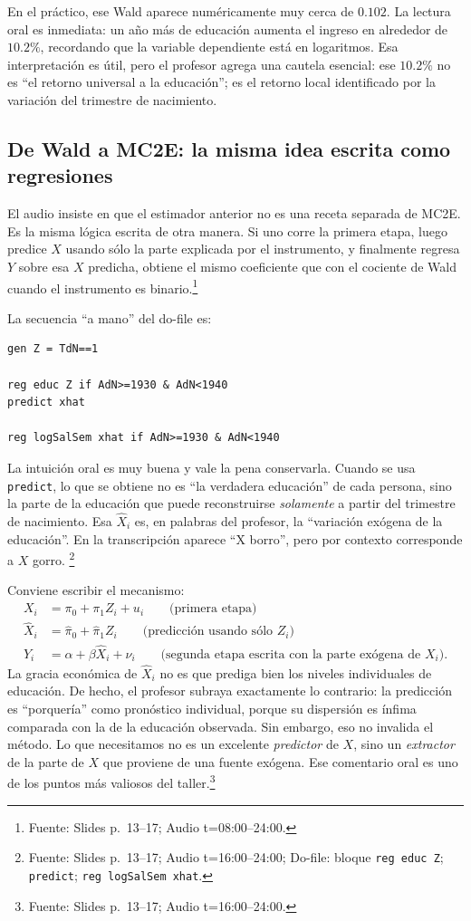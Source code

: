 \documentclass[11pt]{article}
\newcommand{\q}[1]{``#1''}
\newcommand{\source}[2]{\footnote{Fuente: Slides p.~#1; Audio t=#2.}}
\newcommand{\sourced}[3]{\footnote{Fuente: Slides p.~#1; Audio t=#2; Do-file: #3.}}
\begin{document}
En el práctico, ese Wald aparece numéricamente muy cerca de \(0.102\). La lectura oral es inmediata: un año más de educación aumenta el ingreso en alrededor de \(10.2\%\), recordando que la variable dependiente está en logaritmos. Esa interpretación es útil, pero el profesor agrega una cautela esencial: ese \(10.2\%\) no es \q{el retorno universal a la educación}; es el retorno local identificado por la variación del trimestre de nacimiento.

\subsection{De Wald a MC2E: la misma idea escrita como regresiones}

El audio insiste en que el estimador anterior no es una receta separada de MC2E. Es la misma lógica escrita de otra manera. Si uno corre la primera etapa, luego predice \(X\) usando sólo la parte explicada por el instrumento, y finalmente regresa \(Y\) sobre esa \(X\) predicha, obtiene el mismo coeficiente que con el cociente de Wald cuando el instrumento es binario.\source{13--17}{08:00--24:00}

La secuencia \q{a mano} del do-file es:
\begin{lstlisting}
gen Z = TdN==1

reg educ Z if AdN>=1930 & AdN<1940
predict xhat

reg logSalSem xhat if AdN>=1930 & AdN<1940
\end{lstlisting}

La intuición oral es muy buena y vale la pena conservarla. Cuando se usa \texttt{predict}, lo que se obtiene no es \q{la verdadera educación} de cada persona, sino la parte de la educación que puede reconstruirse \emph{solamente} a partir del trimestre de nacimiento. Esa \( \hat X_i \) es, en palabras del profesor, la \q{variación exógena de la educación}. En la transcripción aparece \q{X borro}, pero por contexto corresponde a \(X\) gorro. \sourced{13--17}{16:00--24:00}{bloque \texttt{reg educ Z}; \texttt{predict}; \texttt{reg logSalSem xhat}}

Conviene escribir el mecanismo:
\[
\begin{aligned}
X_i &= \pi_0+\pi_1 Z_i+u_i
\qquad \text{(primera etapa)}\\
\hat X_i &= \hat\pi_0+\hat\pi_1 Z_i
\qquad \text{(predicción usando sólo \(Z_i\))}\\
Y_i &= \alpha+\beta \hat X_i+\nu_i
\qquad \text{(segunda etapa escrita con la parte exógena de \(X_i\))}.
\end{aligned}
\]
La gracia económica de \(\hat X_i\) no es que prediga bien los niveles individuales de educación. De hecho, el profesor subraya exactamente lo contrario: la predicción es \q{porquería} como pronóstico individual, porque su dispersión es ínfima comparada con la de la educación observada. Sin embargo, eso no invalida el método. Lo que necesitamos no es un excelente \emph{predictor} de \(X\), sino un \emph{extractor} de la parte de \(X\) que proviene de una fuente exógena. Ese comentario oral es uno de los puntos más valiosos del taller.\source{13--17}{16:00--24:00}
\end{document}
